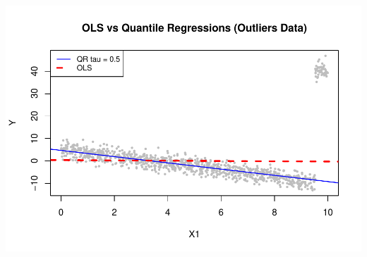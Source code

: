 \documentclass[fleqn,8pt]{latex/stylish_article} %
\begin{document}
\begin{center}\includegraphics[width=0.8\linewidth]{ADR_project_files/figure-latex/unnamed-chunk-11-1} \end{center}
\end{document}
